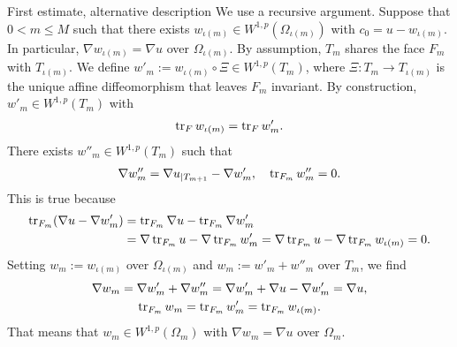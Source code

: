 \documentclass[10pt,a4paper]{article}
\newcommand{\mwl}[1]{{\color{red}#1}}
\begin{document}
 \mwl{First estimate, alternative description}
    We use a recursive argument.
    Suppose that $0 < m \leq M$ such that there exists $w_{\iota(m)} \in W^{1,p}(\Omega_{\iota(m)})$ with $c_{0} = u - w_{\iota(m)}$.
    In particular, $\nabla w_{\iota(m)} = \nabla u$ over $\Omega_{\iota(m)}$. 
    By assumption, $T_{m}$ shares the face $F_{m}$ with $T_{\iota(m)}$. 
    We define $w'_{m} := w_{\iota(m)} \circ \Xi \in W^{1,p}(T_{m})$,
    where $\Xi : T_{m} \rightarrow T_{\iota(m)}$ is the unique affine diffeomorphism that leaves $F_{m}$ invariant. 
    By construction, $w'_{m} \in W^{1,p}(T_{m})$ with 
    \begin{align*}
        \operatorname{tr}_F w_{\iota(m)} = \operatorname{tr}_F w'_{m}
        .
    \end{align*}
    There exists $w''_{m} \in W^{1,p}(T_{m})$ such that 
    \begin{align*}
        \nabla w''_{m} = \nabla u_{|T_{m+1}} - \nabla w'_{m}, 
        \quad 
        \operatorname{tr}_{F_{m}} w''_{m} = 0.
    \end{align*}
    This is true because 
    \begin{align*}
        \operatorname{tr}_{F_{m}}( \nabla u - \nabla w'_{m} ) 
        &= 
        \operatorname{tr}_{F_{m}} \nabla u - \operatorname{tr}_{F_{m}} \nabla w'_{m}
        \\&= 
        \nabla \operatorname{tr}_{F_{m}} u - \nabla \operatorname{tr}_{F_{m}} w'_{m}
        = 
        \nabla \operatorname{tr}_{F_{m}} u - \nabla \operatorname{tr}_{F_{m}} w_{\iota(m)}
        = 
        0
        .
    \end{align*}
    Setting $w_{m} := w_{\iota(m)}$ over $\Omega_{\iota(m)}$ and $w_{m} := w'_{m} + w''_{m}$ over $T_{m}$, 
    we find 
    \begin{gather*}
        \nabla w_{m} = \nabla w'_{m} + \nabla w''_{m} = \nabla w'_{m} + \nabla u - \nabla w'_{m} = \nabla u,
        \\
        \operatorname{tr}_{F_{m}} w_{m} = \operatorname{tr}_{F_{m}} w'_{m} = \operatorname{tr}_{F_{m}} w_{\iota(m)}.
    \end{gather*}
    That means that $w_{m} \in W^{1,p}(\Omega_{m})$ with $\nabla w_{m} = \nabla u$ over $\Omega_{m}$. 
\end{document}
